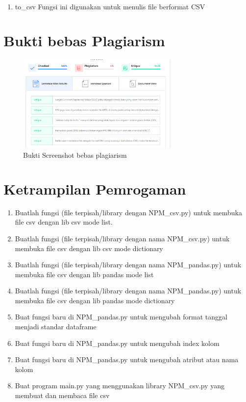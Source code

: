 \documentclass[a4paper, 12pt]{article}
\begin{document}
\begin{enumerate}
\begin{enumerate}
\item to\_csv
\hfill\break
	Fungsi ini digunakan untuk menulis file berformat CSV

\end{enumerate}
\section{Bukti bebas Plagiarism}
\begin{figure}[H]
			\includegraphics[width=8cm]{figure/1.PNG}
			\centering
			\caption{Bukti Screenshot bebas plagiarism}
	\end{figure}
\section{Ketrampilan Pemrogaman}
\begin{enumerate}
\item Buatlah fungsi (file terpisah/library dengan NPM\_csv.py) untuk membuka file csv dengan lib csv mode list.

\item Buatlah fungsi (file terpisah/library dengan nama NPM\_csv.py) untuk membuka file csv dengan lib csv mode dictionary

\item Buatlah fungsi (file terpisah/library dengan nama NPM\_pandas.py) untuk membuka file csv dengan lib pandas mode list

\item Buatlah fungsi (file terpisah/library dengan nama NPM\_pandas.py) untuk membuka file csv dengan lib pandas mode dictionary
\item Buat fungsi baru di NPM\_pandas.py untuk mengubah format tanggal menjadi standar dataframe
\item Buat fungsi baru di NPM\_pandas.py untuk mengubah index kolom
\item Buat fungsi baru di NPM\_pandas.py untuk mengubah atribut atau nama kolom
\item Buat program main.py yang menggunakan library NPM\_csv.py yang membuat dan membaca file csv


\end{enumerate}
\end{enumerate}
\end{document}
